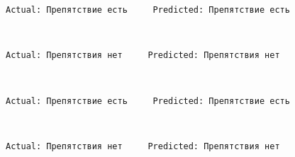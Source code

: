 \documentclass[11pt]{article}
\begin{document}
    \begin{Verbatim}[commandchars=\\\{\}]
Actual: Препятствие есть     Predicted: Препятствие есть

    \end{Verbatim}

    \begin{center}
    \end{center}
    { \hspace*{\fill} \\}
    
    \begin{Verbatim}[commandchars=\\\{\}]
Actual: Препятствия нет     Predicted: Препятствия нет

    \end{Verbatim}

    \begin{center}
    \end{center}
    { \hspace*{\fill} \\}
    
    \begin{Verbatim}[commandchars=\\\{\}]
Actual: Препятствие есть     Predicted: Препятствие есть

    \end{Verbatim}

    \begin{center}
    \end{center}
    { \hspace*{\fill} \\}
    
    \begin{Verbatim}[commandchars=\\\{\}]
Actual: Препятствия нет     Predicted: Препятствия нет

    \end{Verbatim}

    \begin{center}
    \end{center}
    { \hspace*{\fill} \\}
    
\end{document}
